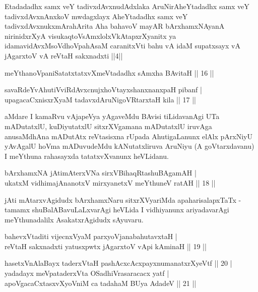 
\begin{shl}
Etadadadhx samx veY tadivxdAvxnudAdxlaka AruNirAheYtadadhx samx veY tadivxdAvxnAnxkoV mwdagxlayx AheYtadadhx samx veY tadivxdAvxnukxmArahArita Aha bahavoV mayAR bArxhamxNAyanA nirinidxrXyA visukaqtoV\s sAmxlolxVkAtapxrXyanitx ya idamavidAvxMsoV\s dhoVpahAsaM caranitxVti bahu vA idaM supatxsayx vA jAgarxtoV vA reVtaH sakxnadxti ||4||
\end{shl}

\begin{shl}
meYthanoVpaniSatatxtatxvXmeVtadadhx sAmx\s \s ha BAvitaH \hfill|| 16 || 
\end{shl}

\begin{shl}
savaRdeYvA\s \s hutiVviRdAvxcnujxhoVtayxshanxnanxpaH pibanf | \\
upagacaCxnisxrXyaM tadavxdAruNigoVRtarxtaH kila \hfill|| 17 || 
\end{shl}

\begin{artha}
aMdare I kamaRvu vAjapeVya yAgaveMdu BAvisi tiLidavanAgi UTa 
mADutatxlU, kuDiyutatxlU sitxrXVgamana mADutatxlU iruvAga anusaMdhAna 
mADutAtx reVtasisxna rUpada AhutigaLanunx elAlx pArxNiyU yAvAgalU 
hoVma mADuvudeMdu kANutatxliruva AruNiyu (A goVtarxdavanu) I meYthuna 
rahasayxda tatatxvXvanunx heVLidanu.
\end{artha}


\begin{shl}
bArxhamxNA jAtimAterxVNa sirxVBihaqRtashuBAgamAH | \\
ukatxM vidhimajAnanotxV mirxyanetxV meYthuneV ratAH \hfill|| 18 || 
\end{shl}

\begin{artha}
jAti mAtarxvAgidudx bArxhamxNaru sitxrXVyariMda apaharisalapxTaTx - 
tamamx shuBalABavuLaLxvarAgi heVLida I vidhiyanunx ariyadavarAgi 
meYthunadalilx AsakatxrAgidudx sAyuvaru.
\end{artha}

\begin{shl}
bahevxVtaditi vijecnxVyaM parxyoVjanabahutavxtaH | \\
reVtaH sakxnadxti yatusxpwtx jAgarxtoV vA\s pi kAminaH \hfill|| 19 || 
\end{shl}

\begin{shl}
hasetxVnA\s \s laBayx taderxVtaH pashAcxcAcxpayxnumanatxrXyeVtf \hfill|| 20 | \\
yadadayx meV\s pataderxVta OSadhiVrasaracacx yatf | \\
apoV\s gacaCxtasxvXyoVniM ca tadahaM BUya AdadeV \hfill|| 21 || 
\end{shl}

